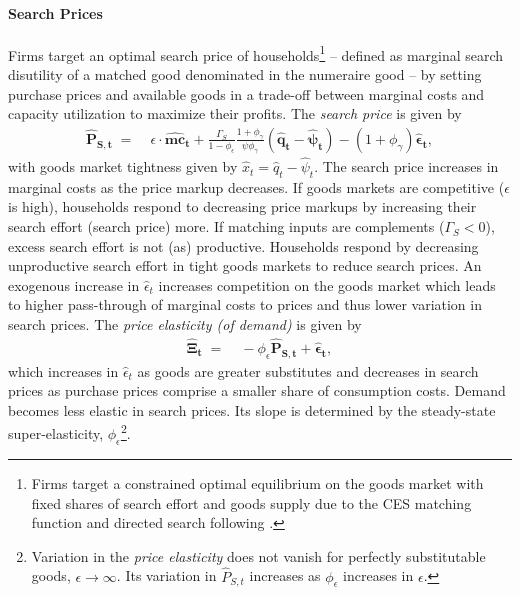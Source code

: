 \documentclass[12pt,3p,authoryear,review]{elsarticle}
\begin{document}
\paragraph{Search Prices}%
Firms target an optimal search price of households\footnote{Firms target a constrained optimal equilibrium on the goods market with fixed shares of search effort and goods supply due to the CES matching function and directed search following \cite{moenCompetitiveSearchEquilibrium1997}.} -- defined as marginal search disutility of a matched good denominated in the numeraire good -- by setting purchase prices and available goods in a trade-off between marginal costs and capacity utilization to maximize their profits. The \emph{search price} is given by%
\begin{align}\label{eq:lin_marg_search}%
	\boldsymbol{\hat{P}_{S,t}} \; = & \; \epsilon \cdot \boldsymbol{\hat{mc}_t} + \frac{\Gamma_S}{1-\phi_\epsilon}\frac{1+\phi_\gamma}{\psi\phi_\gamma}  \left( \boldsymbol{\hat{q}_t} - \boldsymbol{\hat{\psi}_t} \right) - \left(1+\phi_\gamma\right) \boldsymbol{\hat{\epsilon}_t},%
\end{align}%
with goods market tightness given by $\hat{x}_t = \hat{q}_t - \hat{\psi}_t$. The search price increases in marginal costs as the price markup decreases. If goods markets are competitive ($\epsilon$ is high), households respond to decreasing price markups by increasing their search effort (search price) more. If matching inputs are complements ($\Gamma_S<0$), excess search effort is not (as) productive. Households respond by decreasing unproductive search effort in tight goods markets to reduce search prices. An exogenous increase in $\hat{\epsilon}_t$ increases competition on the goods market which leads to higher pass-through of marginal costs to prices and thus lower variation in search prices. The \emph{price elasticity (of demand)} is given by%
\begin{align}\label{eq:lin_price_elasticity}%
	\boldsymbol{\hat{\Xi}_t} \; = & \; -\phi_\epsilon \boldsymbol{\hat{P}_{S,t}} + \boldsymbol{\hat{\epsilon}_t},%
\end{align}%
which increases in $\hat{\epsilon}_t$ as goods are greater substitutes and decreases in search prices as purchase prices comprise a smaller share of consumption costs. Demand becomes less elastic in search prices. Its slope is determined by the steady-state super-elasticity, $\phi_\epsilon$\footnote{Variation in the \emph{price elasticity} does not vanish for perfectly substitutable goods, $\epsilon \rightarrow \infty$. Its variation in $\hat{P}_{S,t}$ increases as $\phi_\epsilon$ increases in $\epsilon$.}.%
\end{document}
